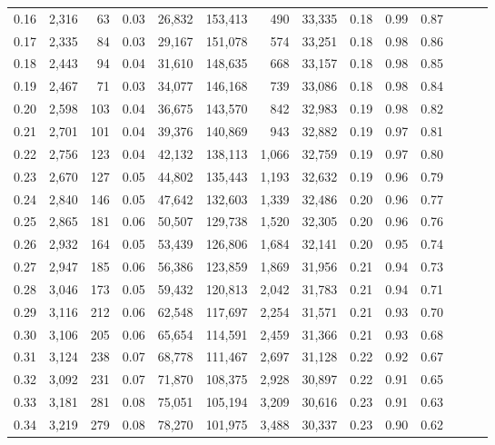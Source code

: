 \begin{tabular}{rrrrrrrrrrrrrr}
0.16 &  2,316 &   63 &  0.03 &   26,832 &  153,413 &     490 &  33,335 &  0.18 &  0.99 &      0.87 \\
0.17 &  2,335 &   84 &  0.03 &   29,167 &  151,078 &     574 &  33,251 &  0.18 &  0.98 &      0.86 \\
0.18 &  2,443 &   94 &  0.04 &   31,610 &  148,635 &     668 &  33,157 &  0.18 &  0.98 &      0.85 \\
0.19 &  2,467 &   71 &  0.03 &   34,077 &  146,168 &     739 &  33,086 &  0.18 &  0.98 &      0.84 \\
0.20 &  2,598 &  103 &  0.04 &   36,675 &  143,570 &     842 &  32,983 &  0.19 &  0.98 &      0.82 \\
0.21 &  2,701 &  101 &  0.04 &   39,376 &  140,869 &     943 &  32,882 &  0.19 &  0.97 &      0.81 \\
0.22 &  2,756 &  123 &  0.04 &   42,132 &  138,113 &   1,066 &  32,759 &  0.19 &  0.97 &      0.80 \\
0.23 &  2,670 &  127 &  0.05 &   44,802 &  135,443 &   1,193 &  32,632 &  0.19 &  0.96 &      0.79 \\
0.24 &  2,840 &  146 &  0.05 &   47,642 &  132,603 &   1,339 &  32,486 &  0.20 &  0.96 &      0.77 \\
0.25 &  2,865 &  181 &  0.06 &   50,507 &  129,738 &   1,520 &  32,305 &  0.20 &  0.96 &      0.76 \\
0.26 &  2,932 &  164 &  0.05 &   53,439 &  126,806 &   1,684 &  32,141 &  0.20 &  0.95 &      0.74 \\
0.27 &  2,947 &  185 &  0.06 &   56,386 &  123,859 &   1,869 &  31,956 &  0.21 &  0.94 &      0.73 \\
0.28 &  3,046 &  173 &  0.05 &   59,432 &  120,813 &   2,042 &  31,783 &  0.21 &  0.94 &      0.71 \\
0.29 &  3,116 &  212 &  0.06 &   62,548 &  117,697 &   2,254 &  31,571 &  0.21 &  0.93 &      0.70 \\
0.30 &  3,106 &  205 &  0.06 &   65,654 &  114,591 &   2,459 &  31,366 &  0.21 &  0.93 &      0.68 \\
0.31 &  3,124 &  238 &  0.07 &   68,778 &  111,467 &   2,697 &  31,128 &  0.22 &  0.92 &      0.67 \\
0.32 &  3,092 &  231 &  0.07 &   71,870 &  108,375 &   2,928 &  30,897 &  0.22 &  0.91 &      0.65 \\
0.33 &  3,181 &  281 &  0.08 &   75,051 &  105,194 &   3,209 &  30,616 &  0.23 &  0.91 &      0.63 \\
0.34 &  3,219 &  279 &  0.08 &   78,270 &  101,975 &   3,488 &  30,337 &  0.23 &  0.90 &      0.62 \\

\end{tabular}
